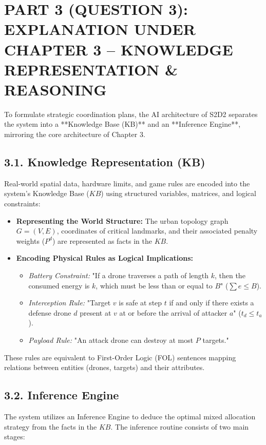 \documentclass[../main.tex]{subfiles}
\begin{document}

\section{PART 3 (QUESTION 3): EXPLANATION UNDER CHAPTER 3 -- KNOWLEDGE REPRESENTATION \& REASONING}

To formulate strategic coordination plans, the AI architecture of S2D2 \cite{mutzari2025defending} separates the system into a **Knowledge Base (KB)** and an **Inference Engine**, mirroring the core architecture of Chapter 3.

\subsection{3.1. Knowledge Representation (KB)}
Real-world spatial data, hardware limits, and game rules are encoded into the system's Knowledge Base ($KB$) using structured variables, matrices, and logical constraints:
\begin{itemize}
    \item \textbf{Representing the World Structure:} The urban topology graph $G=(V,E)$, coordinates of critical landmarks, and their associated penalty weights ($P^d$) are represented as facts in the $KB$.
    \item \textbf{Encoding Physical Rules as Logical Implications:}
    \begin{itemize}
        \item \textit{Battery Constraint:} "If a drone traverses a path of length $k$, then the consumed energy is $k$, which must be less than or equal to $B$" ($\sum e \le B$).
        \item \textit{Interception Rule:} "Target $v$ is safe at step $t$ if and only if there exists a defense drone $d$ present at $v$ at or before the arrival of attacker $a$" ($t_d \le t_a$).
        \item \textit{Payload Rule:} "An attack drone can destroy at most $P$ targets."
    \end{itemize}
\end{itemize}
These rules are equivalent to First-Order Logic (FOL) sentences mapping relations between entities (drones, targets) and their attributes.

\subsection{3.2. Inference Engine}
The system utilizes an Inference Engine to deduce the optimal mixed allocation strategy from the facts in the $KB$. The inference routine consists of two main stages:
\end{document}
